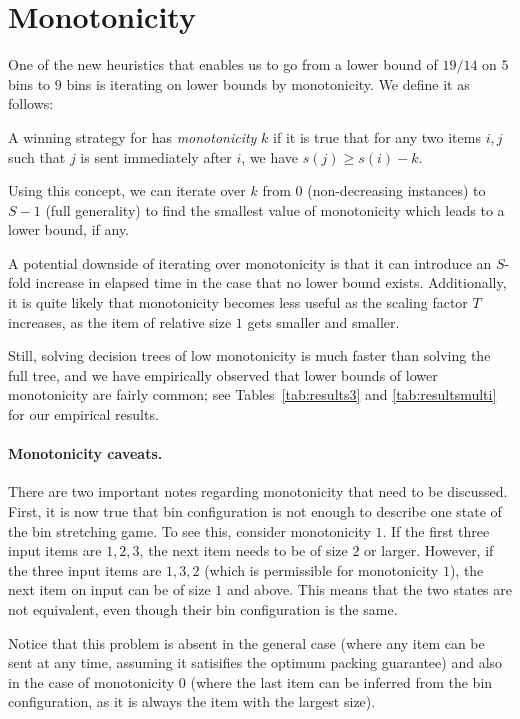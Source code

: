 \section{Monotonicity}\label{sec:monotonicity}

One of the new heuristics that enables us to go from a lower bound of
$19/14$ on $5$ bins to $9$ bins is iterating on lower bounds by
monotonicity. We define it as follows:

\begin{dfn}
A winning strategy for \adversary has \emph{monotonicity} $k$ if it is true
that for any two items $i,j$ such that $j$ is sent immediately after
$i$, we have $s(j) \ge s(i) - k$.
\end{dfn}

Using this concept, we can iterate over $k$ from $0$ (non-decreasing
instances) to $S-1$ (full generality) to find the smallest value of
monotonicity which leads to a lower bound, if any.

A potential downside of iterating over monotonicity is that it can
introduce an $S$-fold increase in elapsed time in the case that no
lower bound exists. Additionally, it is quite likely that monotonicity
becomes less useful as the scaling factor $T$ increases, as the item
of relative size $1$ gets smaller and smaller.

Still, solving decision trees of low monotonicity is much faster than
solving the full tree, and we have empirically observed that lower
bounds of lower monotonicity are fairly common; see
Tables~\ref{tab:results3} and \ref{tab:resultsmulti} for our empirical
results.

\paragraph{Monotonicity caveats.} There are two important notes
regarding monotonicity that need to be discussed. First, it is now
true that bin configuration is not enough to describe one state of the
bin stretching game. To see this, consider monotonicity $1$. If the
first three input items are $1,2,3$, the next item needs to be of size
$2$ or larger. However, if the three input items are $1,3,2$ (which is
permissible for monotonicity $1$), the next item on input can be of
size $1$ and above. This means that the two states are not equivalent,
even though their bin configuration is the same.

Notice that this problem is absent in the general case (where any item
can be sent at any time, assuming it satisifies the optimum packing
guarantee) and also in the case of monotonicity $0$ (where the last
item can be inferred from the bin configuration, as it is always the
item with the largest size).

